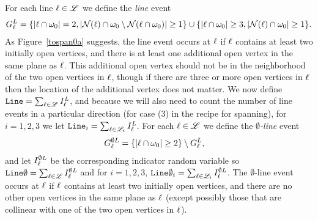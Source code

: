 For each line $\ell\in \mathscr{L}$ we define the {\em line} event
\begin{align*}
G^{L}_\ell = \{ \left|\ell \cap \omega_0\right| =2, \left|\mathcal{N}(\ell)\cap \omega_0\setminus \mathcal{N}(\ell \cap \omega_0)\right|\geq 1 \} \cup \{ \left|\ell \cap \omega_0\right| \geq 3, \left|\mathcal{N}(\ell)\cap \omega_0\right|\geq 1 \}.
\end{align*}
As Figure~\ref{tospan0a} suggests, the line event occurs at $\ell$ if $\ell$ contains at least two initially open vertices, and there is at least one additional open vertex in the same plane as $\ell$.  This additional open vertex should not be in the neighborhood of the two open vertices in $\ell$, though if there are three or more open vertices in $\ell$ then the location of the additional vertex does not matter.  We now define $\operatorname{\tt Line} = \sum_{\ell \in \mathscr{L}} I^{\text{\em L}}_\ell$, and because we will also need to count the number of line events in a particular direction (for case (3) in the recipe for spanning), for $i=1,2,3$ we let $\operatorname{\tt Line}_i = \sum_{\ell \in \mathscr{L}_i} I^{\text{\em L}}_\ell$.  For each $\ell \in \mathscr{L}$ we define the {\em $\emptyset$-line} event 
\begin{align*}
G^{\emptyset  L}_\ell &= \{ \left|\ell \cap \omega_0\right| \geq 2\} \setminus G^{L}_\ell,
\end{align*}
and let $I^{\emptyset\text{\em L}}_\ell$ be the corresponding indicator random variable so $\operatorname{\tt Line\emptyset} = \sum_{\ell \in \mathscr{L}} I^{\emptyset\text{\em L}}_\ell$ and for $i=1,2,3$,  $\operatorname{\tt Line\emptyset}_i = \sum_{\ell \in \mathscr{L}_i} I^{\emptyset\text{\em L}}_\ell$.  The $\emptyset$-line event occurs at $\ell$ if $\ell$ contains at least two initially open vertices, and there are no other open vertices in the same plane as $\ell$ (except possibly those that are collinear with one of the two open vertices in $\ell$).

